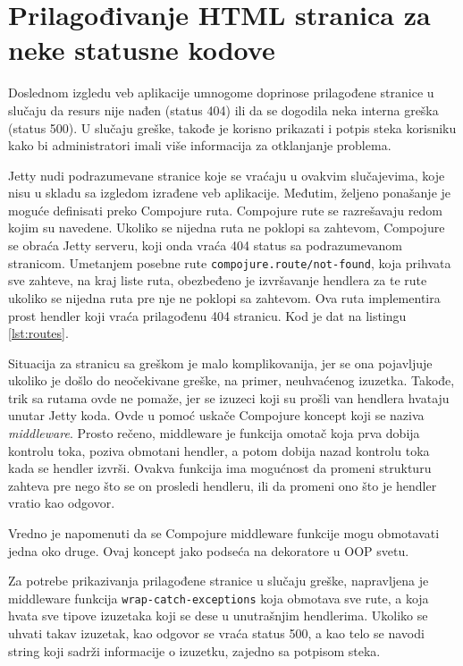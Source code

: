 {\section{Prilagođivanje HTML stranica za neke statusne kodove}
Doslednom izgledu veb aplikacije umnogome doprinose prilagođene stranice u slučaju da resurs nije nađen (status 404) ili da se dogodila neka interna greška (status 500). U slučaju greške, takođe je korisno prikazati i potpis steka korisniku kako bi administratori imali više informacija za otklanjanje problema.


Jetty nudi podrazumevane stranice koje se vraćaju u ovakvim slučajevima, koje nisu u skladu sa izgledom izrađene veb aplikacije. Međutim, željeno ponašanje je moguće definisati preko Compojure ruta. Compojure rute se razrešavaju redom kojim su navedene. Ukoliko se nijedna ruta ne poklopi sa zahtevom, Compojure se obraća Jetty serveru, koji onda vraća 404 status sa podrazumevanom stranicom. Umetanjem posebne rute \texttt{compojure.route/not-found}, koja prihvata sve zahteve, na kraj liste ruta, obezbeđeno je izvršavanje hendlera za te rute ukoliko se nijedna ruta pre nje ne poklopi sa zahtevom. Ova ruta implementira prost hendler koji vraća prilagođenu 404 stranicu. Kod je dat na listingu \ref{lst:routes}.


Situacija za stranicu sa greškom je malo komplikovanija, jer se ona pojavljuje ukoliko je došlo do neočekivane greške, na primer, neuhvaćenog izuzetka. Takođe, trik sa rutama ovde ne pomaže, jer se izuzeci koji su prošli van hendlera hvataju unutar Jetty koda. Ovde u pomoć uskače Compojure koncept koji se naziva \textit{middleware}. Prosto rečeno, middleware je funkcija omotač koja prva dobija kontrolu toka, poziva obmotani hendler, a potom dobija nazad kontrolu toka kada se hendler izvrši. Ovakva funkcija ima mogućnost da promeni strukturu zahteva pre nego što se on prosledi hendleru, ili da promeni ono što je hendler vratio kao odgovor.

Vredno je napomenuti da se Compojure middleware funkcije mogu obmotavati jedna oko druge. Ovaj koncept jako podseća na dekoratore u OOP svetu.

Za potrebe prikazivanja prilagođene stranice u slučaju greške, napravljena je middleware funkcija \texttt{wrap-catch-exceptions} koja obmotava sve rute, a koja hvata sve tipove izuzetaka koji se dese u unutrašnjim hendlerima. Ukoliko se uhvati takav izuzetak, kao odgovor se vraća status 500, a kao telo se navodi string koji sadrži informacije o izuzetku, zajedno sa potpisom steka.

}

